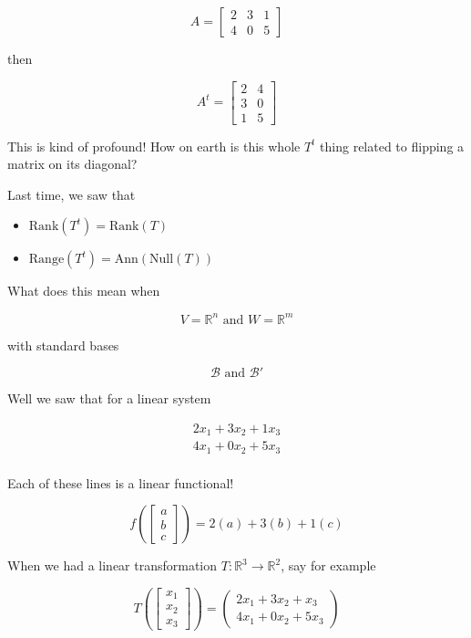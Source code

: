 \documentclass[12pt]{article}
\def\R{{\mathbb R}}
\newcommand{\rank}{\mathrm{Rank}}
\def\Ann{\text{Ann}}
\def\B{\mathcal B}
\def\range{\text{Range}}
\def\Null{\text{Null}}
\begin{document}
  \[
    A = \begin{bmatrix}
      2 & 3 & 1 \\
      4 & 0 & 5
    \end{bmatrix}
  \]

  then

  \[
    A^t = \begin{bmatrix}
      2 & 4 \\
      3 & 0 \\
      1 & 5
    \end{bmatrix}
  \]

  This is kind of profound! How on earth is this whole $T^t$ thing related to
  flipping a matrix on its diagonal?


  Last time, we saw that

  \begin{itemize}
    \item $\rank(T^t) = \rank(T)$
    \item $\range(T^t) = \Ann(\Null(T))$
  \end{itemize}

  What does this mean when

  \[
    V = \R^n \text{ and } W = \R^m
  \]

  with standard bases

  \[
    \B \text{ and } \B'
  \]

  Well we saw that for a linear system

  \begin{align*}
    2x_1 + 3x_2 + 1x_3 \\
    4x_1 + 0x_2 + 5x_3 \\
  \end{align*}

  Each of these lines is a linear functional!

  \[
    f(\begin{bmatrix} a \\ b \\ c \end{bmatrix}) = 2(a) + 3(b) + 1(c)
  \]

  When we had a linear transformation $T: \R^3 \to \R^2$, say for example

  \[
    T(\begin{bmatrix} x_1 \\ x_2 \\ x_3 \end{bmatrix}) = \begin{pmatrix}
      2x_1 + 3x_2 + x_3 \\
      4x_1 + 0x_2 + 5x_3
    \end{pmatrix}
  \]
\end{document}
